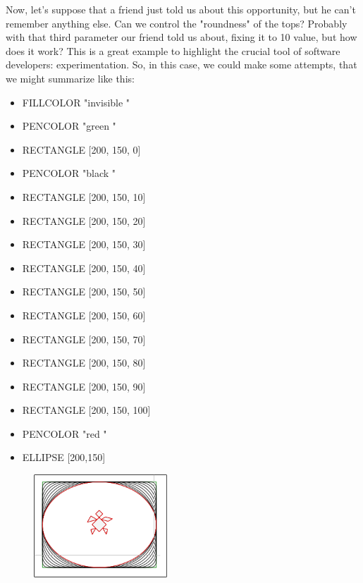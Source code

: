\vskip 1cm

Now, let's suppose that a friend just told us about this opportunity, but he can’t remember anything else. Can we control the "roundness" of the tops? Probably with that third parameter our friend told us about, fixing it to 10 value, but how does it work? This is a great example to highlight the crucial tool of software developers: experimentation. So, in this case, we could make some attempts, that we might summarize like this:


\vskip 1cm

\begin{scriptsize}
\begin{minipage}{0.40\textwidth}
\begin{itemize}[itemsep=-3pt,parsep=2pt]
\item[] FILLCOLOR  "invisible " 
\item[] PENCOLOR  "green " 
\item[] RECTANGLE [200, 150, 0] 
\item[] PENCOLOR  "black " 
\item[] RECTANGLE [200, 150, 10] 
\item[] RECTANGLE [200, 150, 20] 
\item[] RECTANGLE [200, 150, 30] 
\item[] RECTANGLE [200, 150, 40] 
\item[] RECTANGLE [200, 150, 50] 
\item[] RECTANGLE [200, 150, 60] 
\item[] RECTANGLE [200, 150, 70] 
\item[] RECTANGLE [200, 150, 80] 
\item[] RECTANGLE [200, 150, 90] 
\item[] RECTANGLE [200, 150, 100] 
\item[] PENCOLOR  "red " 
\item[] ELLIPSE [200,150]          
\end{itemize}
\end{minipage}
\end{scriptsize}
\begin{minipage}{0.4\textwidth}
\begin{figure}[H]
   \includegraphics[width=5.0cm,trim=4 4 8 4,clip]{./images/disegnare/disegnare-26.png}
   \label{dis-25}
\end{figure}
\end{minipage} \hfill

